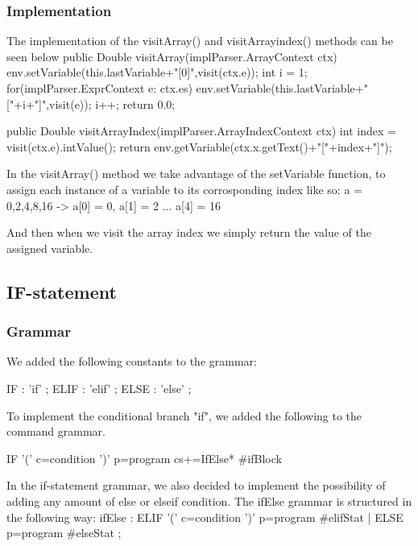 \documentclass[a4paper]{article}
\newenvironment{code}%
   {\snugshade\verbatim}%
   {\endverbatim\endsnugshade}
\begin{document}
\subsubsection{Implementation}
The implementation of the visitArray() and visitArrayindex() methods can be seen below
\begin{code}
public Double visitArray(implParser.ArrayContext ctx){
    env.setVariable(this.lastVariable+"[0]",visit(ctx.e));
    int i = 1;
    for(implParser.ExprContext e: ctx.es){
        env.setVariable(this.lastVariable+"["+i+"]",visit(e));
        i++;
    }
    return 0.0;
}
\end{code}

\begin{code}
public Double visitArrayIndex(implParser.ArrayIndexContext ctx){
    int index = visit(ctx.e).intValue();
    return env.getVariable(ctx.x.getText()+"["+index+"]");
}
\end{code}

In the visitArray() method we take advantage of the setVariable function, to assign each instance of a variable to its corrosponding index like so:
\begin{code}
a = {0,2,4,8,16} -> a[0] = 0, a[1] = 2 ... a[4] = 16
\end{code}

And then when we visit the array index we simply return the value of the assigned variable.

\subsection{IF-statement}
\subsubsection{Grammar}
We added the following constants to the grammar:

\begin{code}
IF    : 'if'   ;
ELIF  : 'elif' ;
ELSE  : 'else' ;
\end{code}

To implement the conditional branch "if", we added the following to the command grammar.
 
\begin{code}
IF	'(' c=condition ')' p=program cs+=IfElse*		#ifBlock
\end{code}
  
In the if-statement grammar, we also decided to implement the possibility of adding any amount of else or elseif condition. The ifElse grammar is structured in the following way:
\begin{code}
ifElse
    : ELIF '(' c=condition ')' p=program	#elifStat
	| ELSE p=program				        #elseStat
	;
\end{code}
\end{document}
